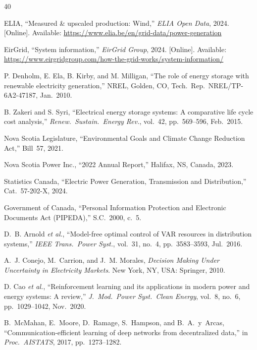 \documentclass[journal]{IEEEtran}
\begin{document}
\begin{thebibliography}{40}

ELIA, ``Measured \& upscaled production: Wind,''
\textit{ELIA Open Data}, 2024. [Online]. Available:
\url{https://www.elia.be/en/grid-data/power-generation}

EirGrid, ``System information,''
\textit{EirGrid Group}, 2024. [Online]. Available:
\url{https://www.eirgridgroup.com/how-the-grid-works/system-information/}

P. Denholm, E. Ela, B. Kirby, and M. Milligan,
``The role of energy storage with renewable electricity generation,''
NREL, Golden, CO, Tech.\ Rep.\ NREL/TP-6A2-47187, Jan.\ 2010.

B. Zakeri and S. Syri,
``Electrical energy storage systems: A comparative life cycle cost
analysis,''
\textit{Renew.\ Sustain.\ Energy Rev.}, vol.~42, pp.~569--596,
Feb.\ 2015.

Nova Scotia Legislature,
``Environmental Goals and Climate Change Reduction Act,'' Bill~57, 2021.

Nova Scotia Power Inc.,
``2022 Annual Report,'' Halifax, NS, Canada, 2023.

Statistics Canada,
``Electric Power Generation, Transmission and Distribution,''
Cat.~57-202-X, 2024.

Government of Canada,
``Personal Information Protection and Electronic Documents Act (PIPEDA),''
S.C.~2000, c.~5.

D.~B. Arnold \textit{et al.},
``Model-free optimal control of VAR resources in distribution systems,''
\textit{IEEE Trans.\ Power Syst.}, vol.~31, no.~4, pp.~3583--3593,
Jul.\ 2016.

A.~J. Conejo, M.\ Carrion, and J.~M. Morales,
\textit{Decision Making Under Uncertainty in Electricity Markets}.
New York, NY, USA: Springer, 2010.

D. Cao \textit{et al.},
``Reinforcement learning and its applications in modern power and energy
systems: A review,''
\textit{J.~Mod.\ Power Syst.\ Clean Energy}, vol.~8, no.~6,
pp.~1029--1042, Nov.\ 2020.

B.~McMahan, E.~Moore, D.~Ramage, S.~Hampson, and B.~A.~y~Arcas,
``Communication-efficient learning of deep networks from decentralized
data,''
in \textit{Proc.\ AISTATS}, 2017, pp.~1273--1282.


\end{thebibliography}
\end{document}
